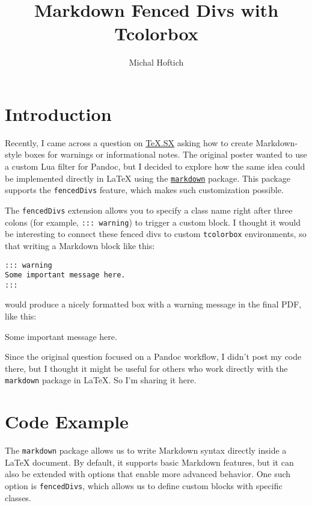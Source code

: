 \documentclass[]{article}
\title{Markdown Fenced Divs with Tcolorbox}
\author{Michal Hoftich}
\begin{document}
\maketitle

\section*{Introduction}

Recently, I came across a question on \href{https://tex.stackexchange.com/q/752194/2891}{TeX.SX} asking how to create Markdown-style boxes for warnings or informational notes.  
The original poster wanted to use a custom Lua filter for Pandoc, but I decided to explore how the same idea could be implemented directly in \LaTeX{} using the \href{https://ctan.org/pkg/markdown?lang=en}{\texttt{markdown}} package. This package supports the \texttt{fencedDivs} feature, which makes such customization possible.  

The \texttt{fencedDivs} extension allows you to specify a class name right after three colons (for example, \texttt{::: warning}) to trigger a custom block.  
I thought it would be interesting to connect these fenced divs to custom \texttt{tcolorbox} environments, so that writing a Markdown block like this:

\begin{verbatim}
::: warning
Some important message here.
:::
\end{verbatim}

would produce a nicely formatted box with a warning message in the final PDF, like this:

\begin{warning}
Some important message here.
\end{warning}

Since the original question focused on a Pandoc workflow, I didn’t post my code there, but I thought it might be useful for others who work directly with the \texttt{markdown} package in \LaTeX{}. So I’m sharing it here.

\section*{Code Example}

The \texttt{markdown} package allows us to write Markdown syntax directly inside a \LaTeX{} document.  
By default, it supports basic Markdown features, but it can also be extended with options that enable more advanced behavior. One such option is \texttt{fencedDivs}, which allows us to define custom blocks with specific classes.
\end{document}
